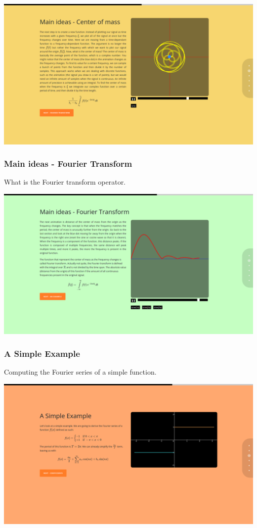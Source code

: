 \documentclass{article}
\begin{document}
\includegraphics[width=\textwidth]{chap10.png}

\subsubsection{Main ideas - Fourier Transform}

What is the Fourier transform operator.

\includegraphics[width=\textwidth]{chap11.png}

\subsubsection{A Simple Example}

Computing the Fourier series of a simple function.

\includegraphics[width=\textwidth]{chap12.png}
\end{document}
